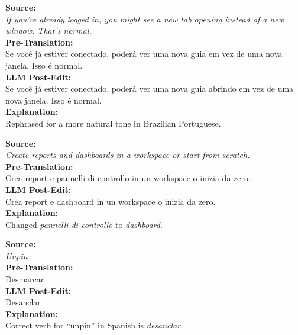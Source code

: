 \documentclass[11pt]{article}
\theoremstyle{plain}
\theoremstyle{definition}
\theoremstyle{remark}
\begin{document}
\begin{tcbraster}[raster columns=2, raster equal height=rows,
                  raster column skip=3mm, raster row skip=3mm]
\begin{tcolorbox}[nobeforeafter, title=Portuguese (pt-BR),
    boxsep=2pt,
    arc=2pt,
    left=3pt,
    right=3pt,
    colback=gray!5,
    colframe=gray!75!black]
\textbf{Source:}\\
\emph{If you’re already logged in, you might see a new tab opening instead of a new window. That’s normal.}\\[3pt]
\textbf{Pre-Translation:}\\
Se você já estiver conectado, poderá ver uma nova guia em vez de uma nova janela. Isso é normal.\\[3pt]
\textbf{LLM Post-Edit:}\\
Se você já estiver conectado, poderá ver uma nova guia abrindo em vez de uma nova janela. Isso é normal.\\[3pt]
\textbf{Explanation:}\\
Rephrased for a more natural tone in Brazilian Portuguese.
\end{tcolorbox}
\begin{tcolorbox}[nobeforeafter, title=Italian (it-IT),
    boxsep=2pt,
    arc=2pt,
    left=3pt,
    right=3pt,
    colback=gray!5,
    colframe=gray!75!black]
\textbf{Source:}\\
\emph{Create reports and dashboards in a workspace or start from scratch.}\\[3pt]
\textbf{Pre-Translation:}\\
Crea report e pannelli di controllo in un workspace o inizia da zero.\\[3pt]
\textbf{LLM Post-Edit:}\\
Crea report e dashboard in un workspace o inizia da zero.\\[3pt]
\textbf{Explanation:}\\
Changed \emph{pannelli di controllo} to \emph{dashboard}.
\end{tcolorbox}
\begin{tcolorbox}[
    title=Spanish (es-419),
    boxsep=2pt,
    arc=2pt,
    left=3pt,
    right=3pt,
    colback=gray!5,
    colframe=gray!75!black
]
\textbf{Source:}\\
\emph{Unpin}\\[3pt]
\textbf{Pre-Translation:}\\
Desmarcar\\[3pt]
\textbf{LLM Post-Edit:}\\
Desanclar\\[3pt]
\textbf{Explanation:}\\
Correct verb for ``unpin'' in Spanish is \emph{desanclar}.
\end{tcolorbox}
\begin{tcolorbox}[nobeforeafter, title=French (fr-FR),
    boxsep=2pt,
    arc=2pt,
    left=3pt,
    right=3pt,
    colback=gray!5,
    colframe=gray!75!black]

\end{tcolorbox}
\end{tcbraster}
\end{document}
